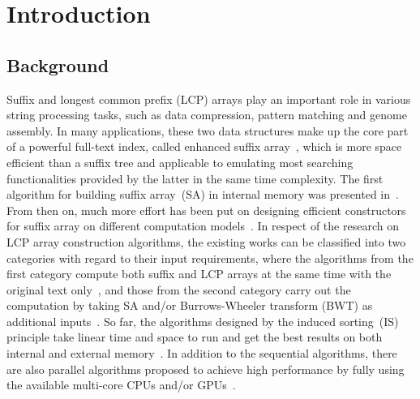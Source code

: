 \documentclass[10pt,journal,compsoc]{IEEEtran}
\begin{document}
\maketitle

\IEEEdisplaynontitleabstractindextext

\IEEEpeerreviewmaketitle

\section{Introduction}\label{sec:introduction}

\subsection{Background} \label{sec:introduction:background}

Suffix and longest common prefix (LCP) arrays play an important role in various string processing tasks, such as data compression, pattern matching and genome assembly. In many applications, these two data structures make up the core part of a powerful full-text index, called enhanced suffix array~\cite{Abouelhodaa2004}, which is more space efficient than a suffix tree and applicable to emulating most searching functionalities provided by the latter in the same time complexity. The first algorithm for building suffix array~(SA) in internal memory was presented in~\cite{Manber1993}. From then on, much more effort has been put on designing efficient constructors for suffix array on different computation models~\cite{Karkkainen2003, Ko2003, Kim2003, Nong11, Dementiev2008, Ferragina2012, Manzini2004, Bingmann12, Karkkainen2014, Nong14, Nong15}. In respect of the research on LCP array construction algorithms, the existing works can be classified into two categories with regard to their input requirements, where the algorithms from the first category compute both suffix and LCP arrays at the same time with the original text only~\cite{Fischer11, Bingmann12, Flick2015}, and those from the second category carry out the computation by taking SA and/or Burrows-Wheeler transform (BWT) as additional inputs~\cite{Kasai2001,Karkkainen2009, Fischer11, Puglisi2008, Deo2013}. So far, the algorithms designed by the induced sorting~(IS) principle take linear time and space to run and get the best results on both internal and external memory~\cite{Nong11, Bingmann12}. In addition to the sequential algorithms, there are also parallel algorithms proposed to achieve high performance by fully using the available multi-core CPUs and/or GPUs~\cite{Osipov2012, Deo2013, Wang2015, Karkkainen2015, Karkkainen2016}.
\end{document}
